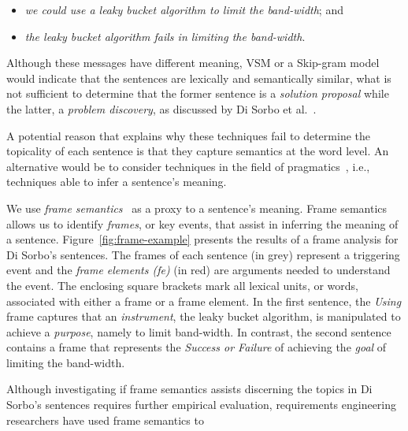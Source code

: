 \begin{itemize}
\item  \textit{we could use a leaky bucket algorithm to limit the band-width}; and
\item \textit{the leaky bucket algorithm fails in limiting the band-width}.
\end{itemize}

Although these messages have different meaning, \acs{VSM} or a Skip-gram model would indicate that the sentences are lexically and semantically similar, what is not sufficient to determine that the former sentence
 is a \textit{solution proposal} while the latter, a \textit{problem discovery}, as discussed by Di Sorbo et al.~\cite{Sorbo2015}. 


A potential reason that explains why these techniques fail to determine the topicality of each sentence is that they capture semantics at the word level. 
An alternative would be to consider techniques in the field of pragmatics~\cite{ariel2008pragmatics, austin1975pragmatics}, i.e., techniques able to infer a sentence's meaning.



We use \textit{frame semantics}~\cite{fillmore1976frame, Baker1998} as a proxy to a sentence's meaning.
Frame semantics allows us to identify \textit{frames},
or key events, that assist in inferring the meaning of a sentence.
Figure~\ref{fig:frame-example} presents the results of a frame
analysis for Di Sorbo's sentences.
The frames of each sentence (in grey) represent a
triggering event and the \textit{frame elements (fe)} (in red) are arguments needed
to understand the event. The enclosing square brackets
mark all lexical units, or words,
associated with either a frame or a frame element.
In the first sentence, the \textit{Using} frame
captures that an \textit{instrument}, the leaky bucket algorithm, is
manipulated to achieve a \textit{purpose}, namely to limit band-width.
In contrast, the second sentence contains a frame that represents the \textit{Success or Failure}
of achieving the \textit{goal} of limiting the band-width. 





Although investigating if frame semantics assists discerning the topics in Di Sorbo's sentences requires further empirical evaluation, requirements engineering researchers have used frame semantics to 




